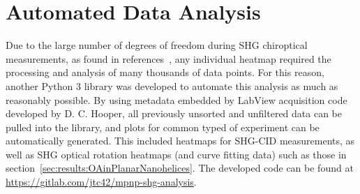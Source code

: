 \section{Automated Data Analysis}\label{sec:appendix:pyshg}
Due to the large number of degrees of freedom during SHG chiroptical measurements, as found in references~\cite{Collins2018b, Hooper2017}, any individual heatmap required the processing and analysis of many thousands of data points. For this reason, another Python 3 library was developed to automate this analysis as much as reasonably possible. By using metadata embedded by LabView acquisition code developed by D. C. Hooper, all previously unsorted and unfiltered data can be pulled into the library, and plots for common typed of experiment can be automatically generated. This included heatmaps for SHG-CID measurements, as well as SHG optical rotation heatmaps (and curve fitting data) such as those in section~\ref{sec:results:OAinPlanarNanohelices}.
The developed code can be found at \url{https://gitlab.com/jtc42/mpnp-shg-analysis}.